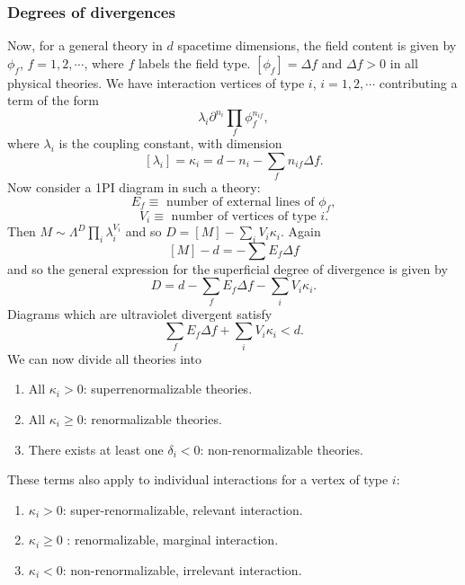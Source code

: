 \subsubsection{Degrees of divergences}
Now, for a general theory in $d$ spacetime dimensions, the field content is given by $\phi_f$, $f=1,2,\cdots$, where $f$ labels
the field type. $[\phi_f]=\Delta f$ and $\Delta f > 0$ in all physical theories. We have interaction vertices of type $i$, $i = 1,2,\cdots$
contributing a term of the form
\[\lambda_i \partial^{n_i} \prod_f \phi_f^{n_{if}},\]
where $\lambda_i$ is the coupling constant, with dimension
\[[\lambda_i] = \kappa_i = d - n_i - \sum_f n_{if}\Delta f .\]
Now consider a 1PI diagram in such a theory:
\[E_f \equiv \mbox{ number of external lines of } \phi_f,\]
\[V_i \equiv \mbox{ number of vertices of type } i.\]
Then $M \sim \Lambda^D \prod_i \lambda_i ^{V_i}$ and so $D = [M] - \sum_i V_i \kappa_i$. Again
\[[M] - d = -\sum E_f \Delta f \]
and so the general expression for the superficial degree of divergence is given by
\[D = d - \sum_f E_f \Delta f - \sum_i V_i \kappa_i.\]
Diagrams which are ultraviolet divergent satisfy
\[\sum_f E_f \Delta f + \sum_i V_i \kappa_i < d.\]
We can now divide all theories into
\begin{enumerate}
\item All $\kappa_i > 0$: superrenormalizable theories.
\item All $\kappa_i \geq 0$: renormalizable theories.
\item There exists at least one $\delta_i < 0$: non-renormalizable theories.
\end{enumerate}
These terms also apply to individual interactions for a vertex of type $i$:
\begin{enumerate}
\item $\kappa_i > 0$: super-renormalizable, relevant interaction.
\item $\kappa_i \geq 0$ : renormalizable, marginal interaction.
\item $\kappa_i < 0$: non-renormalizable, irrelevant interaction.
\end{enumerate}

